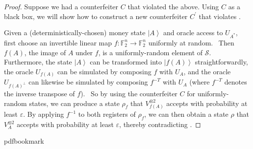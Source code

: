 \begin{proof}
Suppose we had a counterfeiter $C$ that violated the above. Using $C$ as a
black box, we will show how to construct a new counterfeiter $C^{\prime}%
$ that violates .

Given a (deterministically-chosen) money state $\left\vert A\right\rangle $
and oracle access to $U_{A^{\ast}}$, first choose an invertible linear map
$f:\mathbb{F}_{2}^{n}\rightarrow\mathbb{F}_{2}^{n}$ uniformly at random.
\ Then $f\left(  A\right)  $, the image of $A$ under $f$, is a
uniformly-random element of $\mathcal{S}$. Furthermore, the state
$\left\vert A\right\rangle $ can be transformed into $\left\vert f\left(
A\right)  \right\rangle $ straightforwardly, the oracle $U_{f\left(
A\right)  }$ can be simulated by composing $f$ with $U_{A}$, and the oracle
$U_{f\left(  A\right)  ^{\bot}}$ can likewise be simulated by composing
$f^{-T}$ with $U_{A}$ (where $f^{-T}$ denotes the inverse transpose of $f$).
\ So by using the counterfeiter $C$ for uniformly-random states, we can
produce a state $\rho_{f}$ that $V_{f\left(  A\right)  }^{\otimes2}$ accepts
with probability at least $\varepsilon$. By applying $f^{-1}$ to both
registers of $\rho_{f}$, we can then obtain a state $\rho$ that
$V_{A}^{\otimes2}$ accepts with probability at least $\varepsilon$, thereby
contradicting .
\end{proof}

%
%
%
%
%
\providecommand{\bibhead}[1]{}
%
\expandafter\ifx\csname pdfbookmark\endcsname\relax%
  \providecommand{\tocrefpdfbookmark}{}
\else\providecommand{\tocrefpdfbookmark}{%
   \hypertarget{tocreferences}{}%
   \pdfbookmark[1]{References}{tocreferences}}%
\fi

